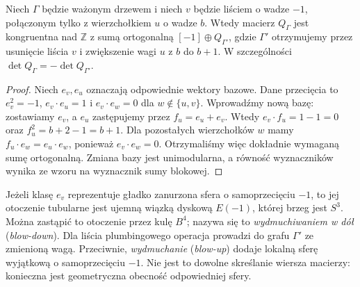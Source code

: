 \begin{stwierdzenie}
Niech $\Gamma$ będzie ważonym drzewem i niech $v$
będzie liściem o wadze $-1$, połączonym tylko z
wierzchołkiem $u$ o wadze $b$. Wtedy macierz
$Q_\Gamma$ jest kongruentna nad $\mathbb Z$
z sumą ortogonalną $[-1]\oplus Q_{\Gamma'}$, gdzie
$\Gamma'$ otrzymujemy przez usunięcie liścia $v$
i zwiększenie wagi $u$ z $b$ do $b+1$.
W szczególności $\det Q_\Gamma=-\det Q_{\Gamma'}$.
\end{stwierdzenie}
\begin{proof}
Niech $e_v,e_u$ oznaczają odpowiednie wektory bazowe.
Dane przecięcia to $e_v^2=-1$, $e_v\cdot e_u=1$
i $e_v\cdot e_w=0$ dla $w\notin\{u,v\}$.
Wprowadźmy nową bazę: zostawiamy $e_v$, a $e_u$
zastępujemy przez $f_u=e_u+e_v$. Wtedy
$e_v\cdot f_u=1-1=0$ oraz
$f_u^2=b+2-1=b+1$. Dla pozostałych wierzchołków
$w$ mamy $f_u\cdot e_w=e_u\cdot e_w$, ponieważ
$e_v\cdot e_w=0$. Otrzymaliśmy więc dokładnie
wymaganą sumę ortogonalną. Zmiana bazy jest
unimodularna, a równość wyznaczników wynika ze wzoru
na wyznacznik sumy blokowej.
\end{proof}

\begin{uwaga}
Jeżeli klasę $e_v$ reprezentuje gładko zanurzona sfera
o samoprzecięciu $-1$, to jej otoczenie tubularne jest
ujemną wiązką dyskową $E(-1)$, której brzeg jest
$S^3$. Można zastąpić to otoczenie przez kulę
$B^4$; nazywa się to \emph{wydmuchiwaniem w dół}
(\emph{blow-down}). Dla liścia plumbingowego operacja
prowadzi do grafu $\Gamma'$ ze zmienioną wagą.
Przeciwnie, \emph{wydmuchanie} (\emph{blow-up}) dodaje
lokalną sferę wyjątkową o samoprzecięciu $-1$.
Nie jest to dowolne skreślanie wiersza macierzy:
konieczna jest geometryczna obecność odpowiedniej sfery.
\end{uwaga}

\begin{center}
\end{center}

